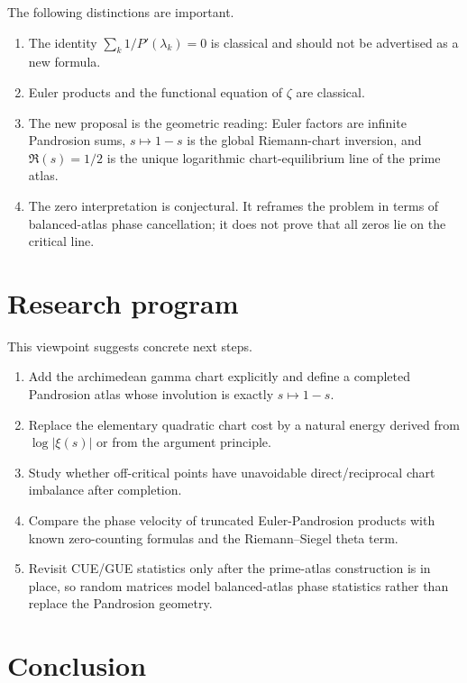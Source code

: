 \documentclass[11pt]{article}
\begin{document}
The following distinctions are important.

\begin{enumerate}[leftmargin=2em]
\item The identity
\(\sum_k1/P'(\lambda_k)=0\) is classical and should not be advertised as a new
formula.
\item Euler products and the functional equation of \(\zeta\) are classical.
\item The new proposal is the geometric reading: Euler factors are infinite
Pandrosion sums, \(s\mapsto1-s\) is the global Riemann-chart inversion, and
\(\Re(s)=1/2\) is the unique logarithmic chart-equilibrium line of the prime
atlas.
\item The zero interpretation is conjectural.  It reframes the problem in
terms of balanced-atlas phase cancellation; it does not prove that all zeros
lie on the critical line.
\end{enumerate}

\section{Research program}

This viewpoint suggests concrete next steps.

\begin{enumerate}[leftmargin=2em]
\item Add the archimedean gamma chart explicitly and define a completed
Pandrosion atlas whose involution is exactly \(s\mapsto1-s\).
\item Replace the elementary quadratic chart cost by a natural energy derived
from \(\log|\xi(s)|\) or from the argument principle.
\item Study whether off-critical points have unavoidable direct/reciprocal
chart imbalance after completion.
\item Compare the phase velocity of truncated Euler-Pandrosion products with
known zero-counting formulas and the Riemann--Siegel theta term.
\item Revisit CUE/GUE statistics only after the prime-atlas construction is in
place, so random matrices model balanced-atlas phase statistics rather than
replace the Pandrosion geometry.
\end{enumerate}

\section{Conclusion}
\end{document}
